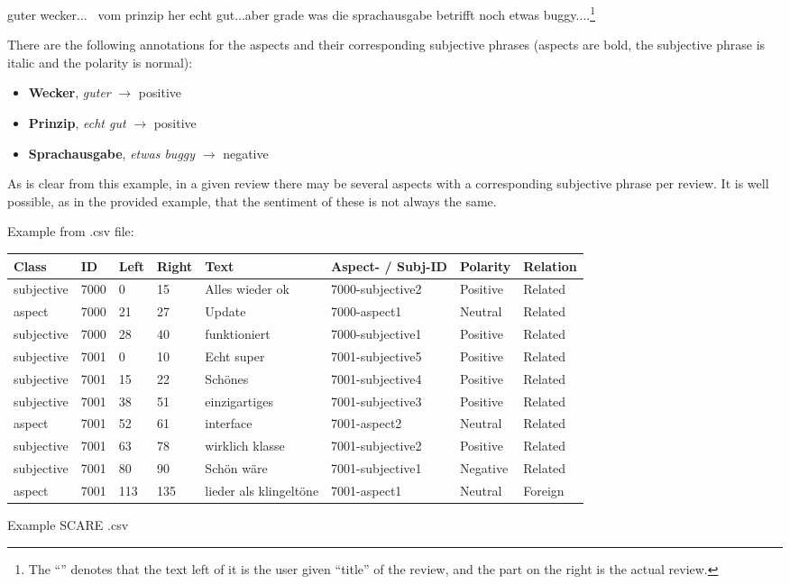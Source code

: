 \begin{examples}
	\label{ex:fine-grained-anno}
	\item guter wecker... \textbar\textbar\ vom prinzip her echt gut...aber grade was die sprachausgabe betrifft noch etwas buggy....\footnote{The ``\textbar\textbar'' denotes that the text left of it is the user given ``title'' of the review, and the part on the right is the actual review.}
\end{examples}

There are the following annotations for the aspects and their corresponding subjective phrases (aspects are bold, the subjective phrase is italic and the polarity is normal):


\begin{itemize}
	\item \textbf{Wecker}, \textit{guter} $\rightarrow$ positive
	\item \textbf{Prinzip}, \textit{echt gut} $\rightarrow$ positive
	\item \textbf{Sprachausgabe}, \textit{etwas buggy} $\rightarrow$ negative
\end{itemize}

As is clear from this example, in a given review there may be several aspects with a corresponding subjective phrase per review.
It is well possible, as in the provided example, that the sentiment of these is not always the same.

Example from .csv file:

{\begin{tabular}{llllllll}
	Class & ID & Left & Right & Text & Aspect- / Subj-ID & Polarity & Relation  \\
	\hline
	subjective & 7000 & 0 & 15 & Alles wieder ok & 7000-subjective2 & Positive & Related \\
	aspect & 7000 & 21 & 27 & Update & 7000-aspect1 & Neutral & Related \\
	subjective & 7000 & 28 & 40 & funktioniert & 7000-subjective1 & Positive & Related \\
	subjective & 7001 & 0 & 10 & Echt super & 7001-subjective5 & Positive & Related \\
	subjective & 7001 & 15 & 22 & Schönes & 7001-subjective4 & Positive & Related \\
	subjective & 7001 & 38 & 51 & einzigartiges & 7001-subjective3 & Positive & Related \\
	aspect & 7001 & 52 & 61 & interface & 7001-aspect2 & Neutral & Related \\
	subjective & 7001 & 63 & 78 & wirklich klasse & 7001-subjective2 & Positive & Related \\
	subjective & 7001 & 80 & 90 & Schön wäre & 7001-subjective1 & Negative & Related \\
	aspect & 7001 & 113 & 135 & lieder als klingeltöne & 7001-aspect1 & Neutral & Foreign \\
\end{tabular}
}{Example SCARE .csv}

